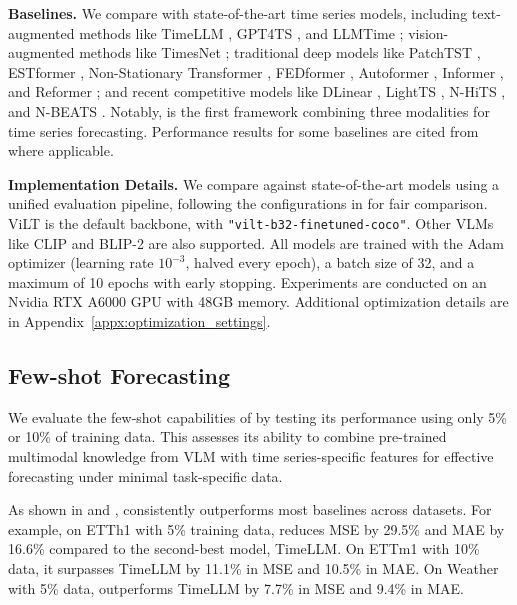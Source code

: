 \noindent\textbf{Baselines.} We compare \method with state-of-the-art time series models, including text-augmented methods like TimeLLM \citeyearpar{jin2023time}, GPT4TS \citeyearpar{zhou2023one}, and LLMTime \citeyearpar{gruver2023large}; vision-augmented methods like TimesNet \citeyearpar{wu2023timesnet}; traditional deep models like PatchTST \citeyearpar{nie2022time}, ESTformer \citeyearpar{woo2022etsformer}, Non-Stationary Transformer \citeyearpar{liu2022non}, FEDformer \citeyearpar{zhou2022fedformer}, Autoformer \citeyearpar{wu2021autoformer}, Informer \citeyearpar{zhou2021informer}, and Reformer \citeyearpar{kitaev2020reformer}; and recent competitive models like DLinear \citeyearpar{zeng2023transformers}, LightTS \citeyearpar{zhang2022less}, N-HiTS \citeyearpar{challu2023nhits}, and N-BEATS \citeyearpar{oreshkin2019n}. Notably, \method is the first framework combining three modalities for time series forecasting. Performance results for some baselines are cited from \citeyearpar{liu2024time} where applicable.


\noindent\textbf{Implementation Details.} We compare \method against state-of-the-art models using a unified evaluation pipeline, following the configurations in \citep{wu2022timesnet} for fair comparison. ViLT \citep{kim2021vilt} is the default backbone, with \texttt{"vilt-b32-finetuned-coco"}. Other VLMs like CLIP and BLIP-2 are also supported. All models are trained with the Adam optimizer (learning rate $10^{-3}$, halved every epoch), a batch size of 32, and a maximum of 10 epochs with early stopping. Experiments are conducted on an Nvidia RTX A6000 GPU with 48GB memory. Additional optimization details are in Appendix~\ref{appx:optimization_settings}.




\subsection{Few-shot Forecasting}

We evaluate the few-shot capabilities of \method by testing its performance using only 5\% or 10\% of training data. This assesses its ability to combine pre-trained multimodal knowledge from VLM with time series-specific features for effective forecasting under minimal task-specific data.

As shown in  and , \method consistently outperforms most baselines across datasets. For example, on ETTh1 with 5\% training data, \method reduces MSE by 29.5\% and MAE by 16.6\% compared to the second-best model, TimeLLM. On ETTm1 with 10\% data, it surpasses TimeLLM by 11.1\% in MSE and 10.5\% in MAE. On Weather with 5\% data, \method outperforms TimeLLM by 7.7\% in MSE and 9.4\% in MAE.

